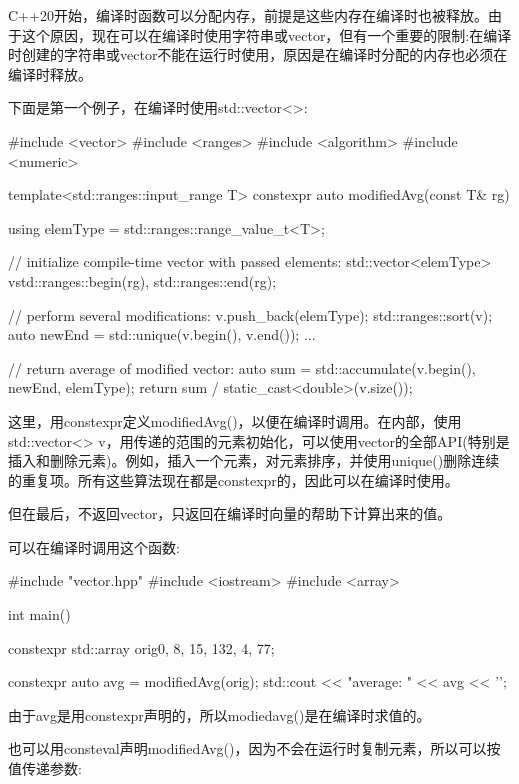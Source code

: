 
C++20开始，编译时函数可以分配内存，前提是这些内存在编译时也被释放。由于这个原因，现在可以在编译时使用字符串或vector，但有一个重要的限制:在编译时创建的字符串或vector不能在运行时使用，原因是在编译时分配的内存也必须在编译时释放。


下面是第一个例子，在编译时使用std::vector<>:


\begin{cpp}
#include <vector>
#include <ranges>
#include <algorithm>
#include <numeric>

template<std::ranges::input_range T>
constexpr auto modifiedAvg(const T& rg)
{
	using elemType = std::ranges::range_value_t<T>;
	
	// initialize compile-time vector with passed elements:
	std::vector<elemType> v{std::ranges::begin(rg),
							std::ranges::end(rg)};
		
	// perform several modifications:
	v.push_back(elemType{});
	std::ranges::sort(v);
	auto newEnd = std::unique(v.begin(), v.end());
	...
	
	// return average of modified vector:
	auto sum = std::accumulate(v.begin(), newEnd,
								elemType{});
	return sum / static_cast<double>(v.size());
}
\end{cpp}

这里，用constexpr定义modifiedAvg()，以便在编译时调用。在内部，使用std::vector<> v，用传递的范围的元素初始化，可以使用vector的全部API(特别是插入和删除元素)。例如，插入一个元素，对元素排序，并使用unique()删除连续的重复项。所有这些算法现在都是constexpr的，因此可以在编译时使用。

但在最后，不返回vector，只返回在编译时向量的帮助下计算出来的值。

可以在编译时调用这个函数:


\begin{cpp}
#include "vector.hpp"
#include <iostream>
#include <array>

int main()
{
	constexpr std::array orig{0, 8, 15, 132, 4, 77};
	
	constexpr auto avg = modifiedAvg(orig);
	std::cout << "average: " << avg << '\n';
}
\end{cpp}

由于avg是用constexpr声明的，所以modiedavg()是在编译时求值的。

也可以用consteval声明modifiedAvg()，因为不会在运行时复制元素，所以可以按值传递参数:

